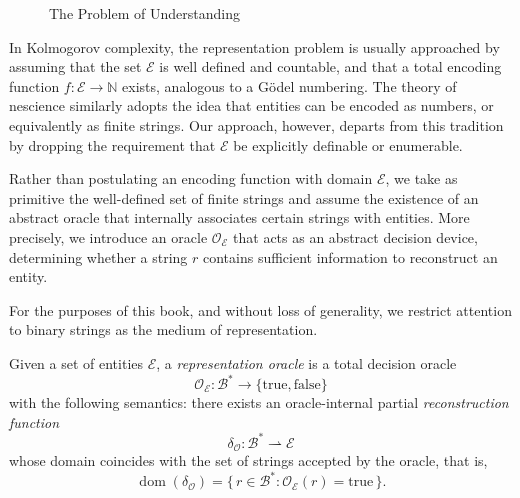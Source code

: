 \begin{figure}[t]
\centering
{}
\caption{The Problem of Understanding}
\end{figure}

In Kolmogorov complexity, the representation problem is usually approached by assuming that the set $\mathcal{E}$ is well defined and countable, and that a total encoding function $f : \mathcal{E} \rightarrow \mathbb{N}$ exists, analogous to a Gödel numbering. The theory of nescience similarly adopts the idea that entities can be encoded as numbers, or equivalently as finite strings. Our approach, however, departs from this tradition by dropping the requirement that $\mathcal{E}$ be explicitly definable or enumerable.

Rather than postulating an encoding function with domain $\mathcal{E}$, we take as primitive the well-defined set of finite strings and assume the existence of an abstract oracle that internally associates certain strings with entities. More precisely, we introduce an oracle $\mathcal{O}_\mathcal{E}$ that acts as an abstract decision device, determining whether a string $r$ contains sufficient information to reconstruct an entity.

For the purposes of this book, and without loss of generality, we restrict attention to binary strings as the medium of representation.

\begin{definition}
\label{def:descriptions_topic}
Given a set of entities \(\mathcal{E}\), a \emph{representation oracle}
is a total decision oracle
\[
\mathcal{O}_{\mathcal{E}} : \mathcal{B}^\ast \longrightarrow \{\mathrm{true},\mathrm{false}\}
\]
with the following semantics: there exists an oracle-internal partial \emph{reconstruction function}
\[
\delta_{\mathcal{O}} : \mathcal{B}^\ast \rightharpoonup \mathcal{E}
\]
whose domain coincides with the set of strings accepted by the oracle, that is,
\[
\operatorname{dom}(\delta_{\mathcal{O}})
=
\{\, r \in \mathcal{B}^\ast : \mathcal{O}_{\mathcal{E}}(r)=\mathrm{true} \,\}.
\]
\end{definition}

